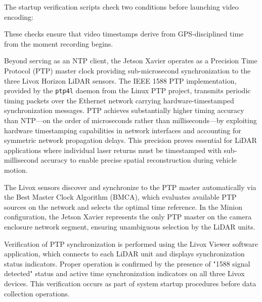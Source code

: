\documentclass{erauthesis}
\begin{document}
The startup verification scripts check two conditions before launching video encoding:


These checks ensure that video timestamps derive from GPS-disciplined time from the moment recording begins.


Beyond serving as an NTP client, the Jetson Xavier operates as a Precision Time Protocol (PTP) master clock providing sub-microsecond synchronization to the three Livox Horizon LiDAR sensors. The IEEE 1588 PTP implementation, provided by the \texttt{ptp4l} daemon from the Linux PTP project, transmits periodic timing packets over the Ethernet network carrying hardware-timestamped synchronization messages.
PTP achieves substantially higher timing accuracy than NTP—on the order of microseconds rather than milliseconds—by exploiting hardware timestamping capabilities in network interfaces and accounting for symmetric network propagation delays. This precision proves essential for LiDAR applications where individual laser returns must be timestamped with sub-millisecond accuracy to enable precise spatial reconstruction during vehicle motion.

The Livox sensors discover and synchronize to the PTP master automatically via the Best Master Clock Algorithm (BMCA), which evaluates available PTP sources on the network and selects the optimal time reference. In the Minion configuration, the Jetson Xavier represents the only PTP master on the camera enclosure network segment, ensuring unambiguous selection by the LiDAR units.

Verification of PTP synchronization is performed using the Livox Viewer software application, which connects to each LiDAR unit and displays synchronization status indicators. Proper operation is confirmed by the presence of "1588 signal detected" status and active time synchronization indicators on all three Livox devices. This verification occurs as part of system startup procedures before data collection operations.

\end{document}
